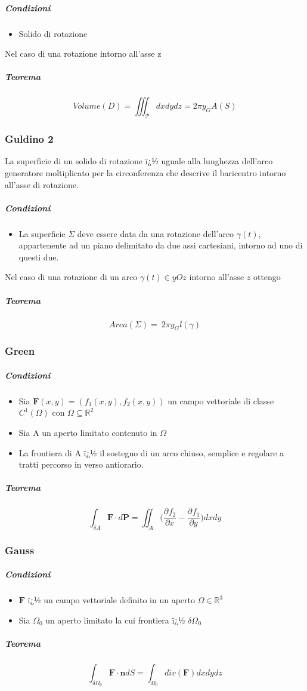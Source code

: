 \documentclass[10pt,a4paper]{report}
\newcommand{\pdv}[3]{\frac{\partial^{#2} #1}{\partial #3^{#2}}}
\begin{document}
			\subparagraph{Condizioni}
				\begin{itemize}
					\item Solido di rotazione 	 
				\end{itemize}
			Nel caso di una rotazione intorno all'asse z	
			\subparagraph{Teorema}		
			\[ Volume(D) = \iiint_{\mathcal{P}}dxdydz = 2\pi y_{G} A(S) \]
			
			\subsubsection{Guldino 2}
			La superficie di un solido di rotazione ï¿½ uguale alla lunghezza dell'arco generatore moltiplicato per la circonferenza che descrive il baricentro intorno all'asse di rotazione.
			
			\subparagraph{Condizioni}
				\begin{itemize}
					\item La superficie $ \Sigma $ deve essere data da una rotazione dell'arco $ \gamma(t)  $, appartenente ad un piano delimitato da due assi cartesiani, intorno ad uno di questi due.
				\end{itemize}
			Nel caso di una rotazione di un arco $ \gamma(t) \in yOz $ intorno all'asse $ z $ ottengo	
			
			\subparagraph{Teorema}		
			\[ Area(\Sigma) = \ 2\pi y_{G} l(\gamma) \]
			
			\subsubsection{Green}
				\subparagraph{Condizioni}
					\begin{itemize}
						\item Sia $ \mathbf{F}(x,y) = (f_{1}(x,y),f_{2}(x,y)) $ un campo vettoriale di classe $C^{1} (\Omega)$ con $\Omega \subseteq \mathbb{R}^{2}$
						\item Sia A un aperto limitato contenuto in $ \Omega $
						\item La frontiera di A ï¿½ il sostegno di un arco chiuso, semplice e regolare a tratti percorso in verso antiorario.
					\end{itemize}
			
			\subparagraph{Teorema}
			
			\[ \int_{\delta A} \mathbf{F} \cdot d \mathbf{P} = \iint_{A} \Big(\pdv{f_{2}}{}{x} - \pdv{f_{1}}{}{y}\Big) dxdy \]
			
			
			\subsubsection{Gauss}
				\subparagraph{Condizioni}
					\begin{itemize}
						\item $ \mathbf{F} $ ï¿½ un campo vettoriale definito in un aperto $ \Omega \in \mathbb{R}^{3} $
						\item Sia $ \Omega_{0} $ un aperto limitato la cui frontiera ï¿½ $ \delta \Omega_{0} $
					\end{itemize}
				\subparagraph{Teorema}
				\[ \int_{\delta \Omega_{0}} \mathbf{F} \cdot \mathbf{n} dS = \int_{\Omega_{0}} div(\mathbf{F}) dxdydz \]
			
\end{document}
